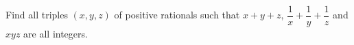 Find all triples $(x,y,z)$ of positive rationals such that $x + y + z$, $\dfrac{1}{x} + \dfrac{1}{y} + \dfrac{1}{z}$ and $xyz$ are all integers.